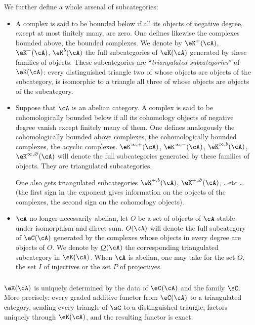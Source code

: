We further define a whole arsenal of subcategories:
\begin{itemize}
  \item A complex is said to be bounded below if all its objects of
    negative degree, except at most finitely many, are zero. One defines
    likewise the complexes bounded above, the bounded complexes. We
    denote by $\eK^+(\cA)$, $\eK^-(\cA)$, $\eK^b(\cA)$ the
    full subcategories of $\eK(\cA)$ generated by these families
    of objects. These subcategories are ``\emph{triangulated
    subcategories}'' of $\eK(\cA)$: every distinguished triangle two of whose
    objects are objects of the subcategory, is isomorphic to a
    triangle all three of whose objects are objects of the subcategory.
  \item Suppose that $\cA$ is an abelian category. A complex is
    said to be cohomologically bounded below if all its cohomology objects
    of negative degree vanish except finitely many of
    them. One defines analogously the cohomologically
    bounded above complexes, the cohomologically bounded complexes, the
    acyclic complexes. $\eK^{\infty,+}(\cA)$, $\eK^{\infty,-}(\cA)$,
    $\eK^{\infty,b}(\cA)$, $\eK^{\infty,\varnothing}(\cA)$ will denote the
    full subcategories generated by these families of objects. They are
    triangulated subcategories.

    One also gets triangulated subcategories $\eK^{+,b}(\cA)$,
    $\eK^{+,\varnothing}(\cA)$, \ldots etc \ldots (the first sign in
    the exponent gives information on the objects of the complexes, the
    second sign on the cohomology objects).
  \item $\cA$ no longer necessarily abelian, let $O$ be a
    set of objects of $\cA$ stable under isomorphism and direct sum.
    $O(\cA)$ will denote the full subcategory of $\eC(\cA)$ generated
    by the complexes whose objects in every degree are objects of $O$.
    We denote by $\underline O(\cA)$ the corresponding triangulated
    subcategory in $\eK(\cA)$. When $\cA$ is abelian, one may
    take for the set $O$, the set $I$ of injectives or the set $P$
    of projectives.
\end{itemize}





\subsubsection{}\label{VIII:1-2-4}

$\eK(\cA)$ is uniquely determined by the data of $\eC(\cA)$ and the
family $\sC$. More precisely: every graded additive functor from
$\eC(\cA)$ to a triangulated category, sending every triangle of
$\sC$ to a distinguished triangle, factors uniquely through
$\eK(\cA)$, and the resulting functor is exact.

